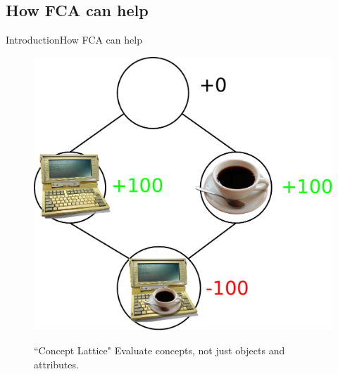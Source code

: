 \subsection{How FCA can help}
\begin{frame}{Introduction}{How FCA can help}

\begin{figure}[ht]
\begin{minipage}[t]{0.55\linewidth}
\vspace{0pt}
\centering
\includegraphics[width=\textwidth]{img/introduction/fca_coffee.pdf}
\end{minipage}
\hfill
\begin{minipage}[t]{0.40\linewidth}
\vspace{0pt}
\begin{block}{``Concept Lattice"}
Evaluate concepts, not just objects and attributes.
\end{block}
\end{minipage}
\end{figure}

\end{frame}